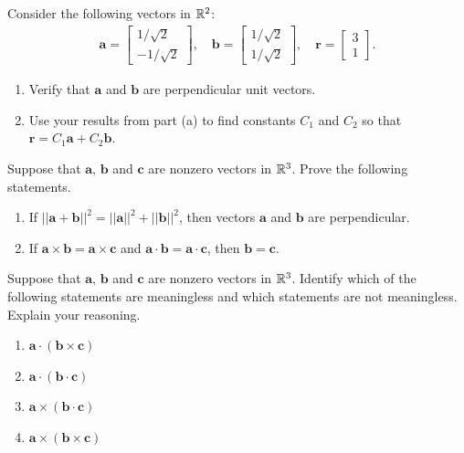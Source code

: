 \item %
Consider the following vectors in $\mathbb{R}^2$:
\begin{align*}
\mathbf{a} = \begin{bmatrix} 1/\sqrt{2} \\ -1/\sqrt{2} \end{bmatrix}, \quad
\mathbf{b} = \begin{bmatrix} 1/\sqrt{2} \\ 1/\sqrt{2} \end{bmatrix}, \quad
\mathbf{r} =  \begin{bmatrix} 3 \\ 1 \end{bmatrix}.
\end{align*}
\begin{enumerate}
\item Verify that $\mathbf{a}$ and $\mathbf{b}$ are perpendicular unit vectors. 
\item Use your results from part (a) to find constants $C_1$ and $C_2$ so that $\mathbf{r}=C_1\mathbf{a}+C_2\mathbf{b}$.
\end{enumerate}
\item %
Suppose that $\mathbf{a}$, $\mathbf{b}$ and $\mathbf{c}$ are nonzero vectors in $\mathbb{R}^3$. Prove the following statements.
\begin{enumerate}
\item If $||\mathbf{a} + \mathbf{b}||^2 = ||\mathbf{a}||^2 + ||\mathbf{b}||^2$, then vectors $\mathbf{a}$ and $\mathbf{b}$ are perpendicular. 
\item If $\mathbf{a}\times\mathbf{b} = \mathbf{a}\times\mathbf{c}$ and $\mathbf{a}\cdot\mathbf{b} = \mathbf{a}\cdot\mathbf{c}$, then $\mathbf{b} =\mathbf{c}$.
\end{enumerate}
\item 
Suppose that $\mathbf{a}$, $\mathbf{b}$ and $\mathbf{c}$ are nonzero vectors in $\mathbb{R}^3$. Identify which of the following statements are meaningless and which statements are not meaningless. Explain your reasoning.
\begin{enumerate}
\item  $\mathbf{a}\cdot (\mathbf{b} \times \mathbf{c})$ 
\item  $\mathbf{a}\cdot (\mathbf{b} \cdot \mathbf{c})$ 
\item  $\mathbf{a}\times (\mathbf{b} \cdot \mathbf{c})$ 
\item  $\mathbf{a}\times (\mathbf{b} \times \mathbf{c})$ 
\end{enumerate}
